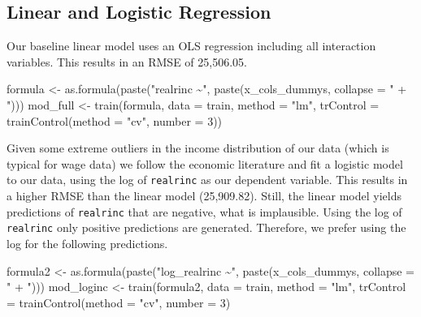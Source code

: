 \documentclass[11pt,a4paper]{article}
\newenvironment{Shaded}{\begin{snugshade}}{\end{snugshade}}
\newcommand{\AttributeTok}[1]{\textcolor[rgb]{0.77,0.63,0.00}{#1}}
\newcommand{\DecValTok}[1]{\textcolor[rgb]{0.00,0.00,0.81}{#1}}
\newcommand{\FunctionTok}[1]{\textcolor[rgb]{0.00,0.00,0.00}{#1}}
\newcommand{\NormalTok}[1]{#1}
\newcommand{\OtherTok}[1]{\textcolor[rgb]{0.56,0.35,0.01}{#1}}
\newcommand{\StringTok}[1]{\textcolor[rgb]{0.31,0.60,0.02}{#1}}
\begin{document}
\hypertarget{linear-and-logistic-regression}{%
\subsection{Linear and Logistic
Regression}\label{linear-and-logistic-regression}}

Our baseline linear model uses an OLS regression including all
interaction variables. This results in an RMSE of 25,506.05.

\begin{Shaded}
\begin{Highlighting}[]
\NormalTok{formula }\OtherTok{\textless{}{-}} \FunctionTok{as.formula}\NormalTok{(}\FunctionTok{paste}\NormalTok{(}\StringTok{"realrinc \textasciitilde{}"}\NormalTok{, }
                            \FunctionTok{paste}\NormalTok{(x\_cols\_dummys, }\AttributeTok{collapse =} \StringTok{" + "}\NormalTok{)))}
\NormalTok{mod\_full }\OtherTok{\textless{}{-}} \FunctionTok{train}\NormalTok{(formula,}
                  \AttributeTok{data =}\NormalTok{ train, }
                  \AttributeTok{method =} \StringTok{"lm"}\NormalTok{,  }
                  \AttributeTok{trControl =} \FunctionTok{trainControl}\NormalTok{(}\AttributeTok{method =} \StringTok{"cv"}\NormalTok{, }\AttributeTok{number =} \DecValTok{3}\NormalTok{))}
\end{Highlighting}
\end{Shaded}

Given some extreme outliers in the income distribution of our data
(which is typical for wage data) we follow the economic literature
\autocite{Ermini} and fit a logistic model to our data, using the log of
\texttt{realrinc} as our dependent variable. This results in a higher
RMSE than the linear model (25,909.82). Still, the linear model yields
predictions of \texttt{realrinc} that are negative, what is implausible.
Using the log of \texttt{realrinc} only positive predictions are
generated. Therefore, we prefer using the log for the following
predictions.

\begin{Shaded}
\begin{Highlighting}[]
\NormalTok{formula2 }\OtherTok{\textless{}{-}} \FunctionTok{as.formula}\NormalTok{(}\FunctionTok{paste}\NormalTok{(}\StringTok{"log\_realrinc \textasciitilde{}"}\NormalTok{, }
                              \FunctionTok{paste}\NormalTok{(x\_cols\_dummys, }\AttributeTok{collapse =} \StringTok{" + "}\NormalTok{)))}
\NormalTok{mod\_loginc }\OtherTok{\textless{}{-}} \FunctionTok{train}\NormalTok{(formula2,}
                    \AttributeTok{data =}\NormalTok{ train, }
                    \AttributeTok{method =} \StringTok{"lm"}\NormalTok{,  }
                    \AttributeTok{trControl =} \FunctionTok{trainControl}\NormalTok{(}\AttributeTok{method =} \StringTok{"cv"}\NormalTok{, }\AttributeTok{number =} \DecValTok{3}\NormalTok{)}
\end{Highlighting}
\end{Shaded}
\end{document}

